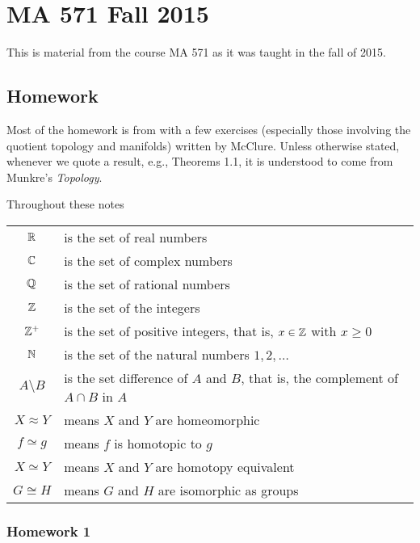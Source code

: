 \section{MA 571 Fall 2015}
This is material from the course MA 571 as it was taught in the fall of
2015.%
\bigskip
\subsection{Homework}
Most of the homework is from \cite{munkres} with a few exercises
(especially those involving the quotient topology and manifolds) written by
McClure. Unless otherwise stated, whenever we quote a result, e.g.,
Theorems 1.1, it is understood to come from Munkre's \emph{Topology}.

Throughout these notes

\begin{tabular}{cl}
  \(\mathbb{R}\) & is the set of real numbers\\
  \(\mathbb{C}\) & is the set of complex numbers\\
  \(\mathbb{Q}\) & is the set of rational numbers\\
  \(\mathbb{Z}\) & is the set of the integers\\
  \(\mathbb{Z}^+\) & is the set of positive integers, that is, \(x\in\mathbb{Z}\) with
               \(x\geq 0\)\\
  \(\mathbb{N}\) & is the set of the natural numbers \(1,2,\dotsc\)\\
  \(A\setminus B\) & is the set difference of \(A\) and \(B\), that is, the
                     complement of \(A\cap B\) in \(A\)\\
  \(X\approx Y\)& means \(X\) and \(Y\) are homeomorphic\\
  \(f\simeq g\)& means \(f\) is homotopic to \(g\)\\
  \(X\simeq Y\)&means \(X\) and \(Y\) are homotopy equivalent\\
  \(G\cong H\)& means \(G\) and \(H\) are isomorphic as groups
\end{tabular}

\newpage
\subsubsection{Homework 1}
\setcounter{exercise}{0}
\setcounter{equation}{0}


